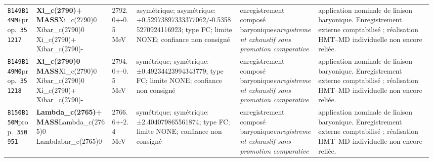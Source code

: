 \begin{landscape}
\begin{longtable}{L{1.85cm}L{4.45cm}L{2.35cm}L{4.05cm}L{3.35cm}L{7.15cm}}
\texttt{B149}\newline \texttt{B149M+}\newline prop.\ \texttt{351217} & \textbf{Xi\_\allowbreak{}c(2790)+ MASS}\newline Xi\_\allowbreak{}c(2790)0 \textbar{}\allowbreak{} Xibar\_\allowbreak{}c(2790)0 \textbar{}\allowbreak{} Xi\_\allowbreak{}c(2790)+ \textbar{}\allowbreak{} Xibar\_\allowbreak{}c(2790)- & 2792.0+-0.5\,MeV & asymétrique; asymétrique: +0.52973897333377062/-0.53585270924116923; type FC; limite NONE; confiance non consigné & enregistrement composé baryonique\newline \emph{enregistrement exhaustif sans promotion comparative} & application nominale de liaison baryonique. Enregistrement externe comptabilisé ; réalisation HMT--MD individuelle non encore reliée. \\
\texttt{B149}\newline \texttt{B149M0}\newline prop.\ \texttt{351218} & \textbf{Xi\_\allowbreak{}c(2790)0 MASS}\newline Xi\_\allowbreak{}c(2790)0 \textbar{}\allowbreak{} Xibar\_\allowbreak{}c(2790)0 \textbar{}\allowbreak{} Xi\_\allowbreak{}c(2790)+ \textbar{}\allowbreak{} Xibar\_\allowbreak{}c(2790)- & 2794.0+-0.5\,MeV & symétrique; symétrique: ±0.49234423994343779; type FC; limite NONE; confiance non consigné & enregistrement composé baryonique\newline \emph{enregistrement exhaustif sans promotion comparative} & application nominale de liaison baryonique. Enregistrement externe comptabilisé ; réalisation HMT--MD individuelle non encore reliée. \\
\texttt{B150}\newline \texttt{B150M}\newline prop.\ \texttt{350951} & \textbf{Lambda\_\allowbreak{}c(2765)+ MASS}\newline Lambda\_\allowbreak{}c(2765)0 \textbar{}\allowbreak{} Lambdabar\_\allowbreak{}c(2765)0 & 2766.6+-2.4\,MeV & symétrique; symétrique: ±2.404079865561874; type FC; limite NONE; confiance non consigné & enregistrement composé baryonique\newline \emph{enregistrement exhaustif sans promotion comparative} & application nominale de liaison baryonique. Enregistrement externe comptabilisé ; réalisation HMT--MD individuelle non encore reliée. \\

\end{longtable}
\end{landscape}
